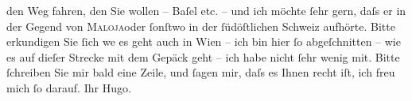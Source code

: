 \begin{ledgroupsized}[t]{13cm}
                    den Weg fahren, den Sie wollen – Baſel etc.
                    – und ich möchte ſehr gern, daſs er in der Gegend von \textsc{Maloja}oder ſonſtwo in der
                    ſüdöſtlichen Schweiz aufhörte. Bitte
                    erkundigen Sie ſich we{\geminationn} es geht auch in Wien – ich bin hier ſo abgeſchnitten – wie es auf
                    dieſer Strecke mit dem Gepäck geht – ich habe nicht ſehr wenig mit. Bitte
                    ſchreiben Sie mir bald eine Zeile, und ſagen mir, daſs es Ihnen recht iſt, ich
                    freu mich ſo darauf. Ihr \spacefill\mbox{Hugo.}\pend
           \endnumbering{}\end{ledgroupsized}  \newcommand{\dateiname}{L00810}\newcommand{\titel}{Hugo von Hofmannsthal an Arthur Schnitzler, 2. 7. [1898]}\newcommand{\editorInnen}{Martin Anton Müller und Gerd-Hermann Susen}
      